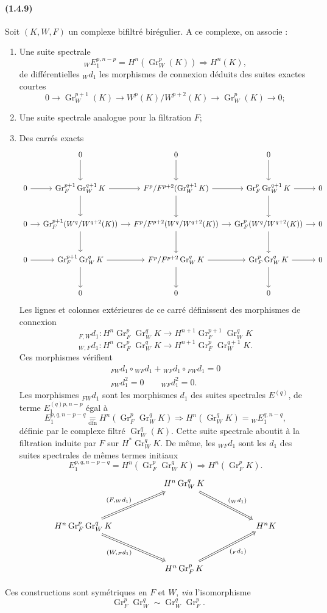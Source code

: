\documentclass[10pt]{article}
\newcommand{\Gr}{\operatorname{Gr}}
\begin{document}
\paragraph{(1.4.9)} Soit $(K,W,F)$ un complexe bifiltré birégulier. A ce complexe, on associe :
\begin{enumerate}[label=\alph*)]
\item Une suite spectrale
\[
{}_WE_1^{p,n-p}=H^n(\Gr_W^p(K))\Rightarrow H^n(K),
\]
de différentielles ${}_Wd_1$ les morphismes de connexion déduits des suites exactes courtes
\[
0\to\Gr_W^{p+1}(K)\to W^p(K)/W^{p+2}(K)\to\Gr_W^p(K)\to0;
\]
\item Une suite spectrale analogue pour la filtration $F$;
\item Des carrés exacts
\[
\begin{tikzcd}[column sep=small,row sep=large]
& 0 \arrow[d] & 0 \arrow[d] & 0 \arrow[d] & \\
0 \arrow[r] & \Gr_F^{p+1}\Gr_W^{q+1}K \arrow[r] \arrow[d] & F^p/F^{p+2}(\Gr_W^{q+1}K) \arrow[r] \arrow[d] & \Gr_F^{p}\Gr_W^{q+1}K \arrow[r] \arrow[d] & 0\\
0 \arrow[r] & \Gr_F^{p+1}(W^q/W^{q+2}(K)) \arrow[r] \arrow[d] & F^p/F^{p+2}(W^q/W^{q+2}(K)) \arrow[r] \arrow[d] & \Gr_F^{p}(W^q/W^{q+2}(K)) \arrow[r] \arrow[d] & 0\\
0 \arrow[r] & \Gr_F^{p+1}\Gr_W^{q}K \arrow[r] \arrow[d] & F^p/F^{p+2}\Gr_W^{q}K \arrow[r] \arrow[d] & \Gr_F^{p}\Gr_W^{q}K \arrow[r] \arrow[d] & 0\\
& 0 & 0 & 0
\end{tikzcd}
\]
Les lignes et colonnes extérieures de ce carré définissent des morphismes de connexion
\[
{}_{F,W}d_1:H^n\Gr_F^p\Gr_W^qK\longrightarrow H^{n+1}\Gr_F^{p+1}\Gr_W^qK
\]
\[
{}_{W,F}d_1:H^n\Gr_F^p\Gr_W^qK\longrightarrow H^{n+1}\Gr_F^p\Gr_W^{q+1}K.
\]
Ces morphismes vérifient
\[
\begin{gathered}
{}_{FW}d_1\circ{}_{WF}d_1+{}_{WF}d_1\circ{}_{FW}d_1=0\\
{}_{FW}d_1^2=0\qquad {}_{WF}d_1^2=0.
\end{gathered}
\]
Les morphismes ${}_{FW}d_1$ sont les morphismes $d_1$ des suites spectrales $E^{(q)}$, de terme $E_1^{(q)p,n-p}$ égal à
\[
\tag{1.4.9.1}
E_1^{p,q,n-p-q}\underset{\mathrm{dfn}}{=}H^n(\Gr_F^p\Gr_W^qK)\Rightarrow H^n(\Gr_W^qK)={}_WE_1^{q,n-q},
\]
définie par le complexe filtré $\Gr_W^q(K)$. Cette suite spectrale aboutit à la filtration induite par $F$ sur $H^*\Gr_W^qK$. De même, les ${}_{WF}d_1$ sont les $d_1$ des suites spectrales de mêmes termes initiaux
\[
\tag{1.4.9.2}
E_1^{p,q,n-p-q}=H^n(\Gr_F^p\Gr_W^qK)\Rightarrow H^n(\Gr_F^pK).
\]
\[
\begin{tikzcd}[column sep=5.2em,row sep=3.2em]
& H^n\Gr_W^qK
  \arrow[dr,Rightarrow,"{\scriptstyle({}_Wd_1)}"]
& \\
H^n\Gr_F^p\Gr_W^qK
  \arrow[ur,Rightarrow,"{\scriptstyle(F,{}_Wd_1)}"]
  \arrow[dr,Rightarrow,"{\scriptstyle(W,{}_Fd_1)}"']
&& H^nK \\
& H^n\Gr_F^pK
  \arrow[ur,Rightarrow,"{\scriptstyle({}_Fd_1)}"']
&
\end{tikzcd}
\]
\end{enumerate}
Ces constructions sont symétriques en $F$ et $W$, \emph{via} l'isomorphisme
\[
\Gr_F^p\Gr_W^q\sim\Gr_W^q\Gr_F^p.
\]
\end{document}
